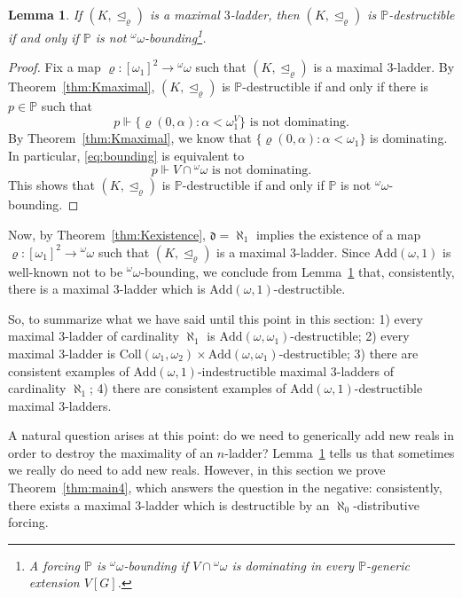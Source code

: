 \documentclass[]{amsart}
\newtheorem{lemma}[theorem]{Lemma}
\theoremstyle{definition}
\theoremstyle{remark}
\begin{document}
\begin{lemma}\label{lemma:bounding}
If $(K, \trianglelefteq_\varrho)$ is a maximal $3$-ladder, then $(K, \trianglelefteq_\varrho)$  is $\mathbb{P}$-destructible if and only if $\mathbb{P}$ is not ${}^\omega \omega$-bounding\footnote{A forcing $\mathbb{P}$ is ${}^\omega \omega$-bounding if $V \cap {}^\omega \omega$ is dominating in every $\mathbb{P}$-generic extension $V[G]$.}.
\end{lemma}
\begin{proof}
Fix a map $\varrho:[\omega_1]^2 \rightarrow {}^\omega \omega$ such that $(K, \trianglelefteq_\varrho)$ is a maximal $3$-ladder. By Theorem~\ref{thm:Kmaximal}, $(K, \trianglelefteq_\varrho)$ is $\mathbb{P}$-destructible if and only if there is  $p \in \mathbb{P}$ such that
\begin{equation}\label{eq:bounding}
p \Vdash \{\varrho(0, \alpha): \alpha < \omega_1^V\} \text{ is not dominating}.
\end{equation}
By Theorem~\ref{thm:Kmaximal}, we know that $\{\varrho(0, \alpha): \alpha < \omega_1\}$ is dominating. In particular, \eqref{eq:bounding} is equivalent to 
\[
p \Vdash V \cap {}^\omega \omega \text{ is not dominating}.
\]
This shows that $(K, \trianglelefteq_\varrho)$ is $\mathbb{P}$-destructible if and only if $\mathbb{P}$ is not ${}^\omega \omega$-bounding.
\end{proof}

Now, by Theorem~\ref{thm:Kexistence}, $\mathfrak{d}=\aleph_1$ implies the existence of a map $\varrho:[\omega_1]^2\rightarrow {}^\omega \omega$ such that $(K, \trianglelefteq_\varrho)$ is a maximal $3$-ladder. Since $\text{Add}(\omega, 1)$ is well-known not to be ${}^\omega \omega$-bounding, we conclude from Lemma~\ref{lemma:bounding} that, consistently, there is a maximal $3$-ladder which is $\text{Add}(\omega, 1)$-destructible.



So, to summarize what we have said until this point in this section: 1) every maximal $3$-ladder of cardinality $\aleph_1$ is $\text{Add}(\omega, \omega_1)$-destructible; 2) every maximal $3$-ladder is $\text{Coll}(\omega_1, \omega_2) \times \text{Add}(\omega, \omega_1)$-destructible; 3) there are consistent examples of $\text{Add}(\omega, 1)$-indestructible maximal $3$-ladders of cardinality $\aleph_1$; 4) there are consistent examples of   $\text{Add}(\omega, 1)$-destructible maximal $3$-ladders.

A natural question arises at this point: do we need to generically add new reals in order to destroy the maximality of an $n$-ladder? Lemma~\ref{lemma:bounding} tells us that sometimes we really do need to add new reals. However, in this section we prove Theorem~\ref{thm:main4}, which answers the question in the negative: consistently, there exists a maximal $3$-ladder which is destructible by an $\aleph_0$-distributive forcing. 
\end{document}
